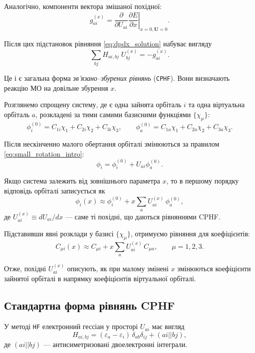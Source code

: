 \documentclass{PySCFBook}
\begin{document}
Аналогічно, компоненти вектора змішаної похідної:
\begin{equation}\label{eq:g_ai_def}
g_{ai}^{(x)}
=
\frac{\partial }{\partial U_{ai}}\left.\frac{\partial E}{\partial x}\right|_{x = 0, \mathbf U= 0}.
\end{equation}

Після цих підстановок рівняння \eqref{eq:dpdx_solution} набуває вигляду
\begin{equation}\label{eq:CPHF_matrix_general}
\sum_{b j} H_{ai,bj}\;U_{bj}^{(x)} = -g_{ai}^{(x)}.
\end{equation}

Це і є загальна форма \emph{зв'язано--збурених рівнянь} (\texttt{CPHF}).
Вони визначають реакцію МО на довільне збурення $x$.

\begin{commentbox}[Приклад]
Розглянемо спрощену систему, де є одна зайнята орбіталь $i$ та одна
віртуальна орбіталь $a$, розкладені за тими самими базисними функціями
$\{\chi_\mu\}$:
\[
\phi_i^{(0)} = C_{1i}\chi_1 + C_{2i}\chi_2 + C_{3i}\chi_3,\qquad
\phi_a^{(0)} = C_{1a}\chi_1 + C_{2a}\chi_2 + C_{3a}\chi_3.
\]

Після нескінченно малого обертання орбіталі змінюються за правилом
\eqref{eq:small_rotation_intro}:
\[
\phi_i = \phi_i^{(0)} + U_{ai}\phi_a^{(0)}.
\]

Якщо система залежить від зовнішнього параметра $x$, то в першому порядку відповідь орбіталі записується як
\[
\phi_i(x) \approx \phi_i^{(0)} + x\sum_a U_{ai}^{(x)}\,\phi_a^{(0)},
\]
де $U_{ai}^{(x)}\equiv dU_{ai}/dx$ — саме ті похідні, що даються рівняннями CPHF.

Підставивши явні розклади у базисі $\{\chi_\mu\}$, отримуємо рівняння для коефіцієнтів:
\[
C_{\mu i}(x) \approx C_{\mu i} + x\sum_a U_{ai}^{(x)}\,C_{\mu a},
\qquad \mu=1,2,3.
\]

Отже, похідні $U_{ai}^{(x)}$ описують, як при малому змінені $x$ змінюються
коефіцієнти зайнятої орбіталі в напрямку коефіцієнтів віртуальної орбіталі.
\end{commentbox}



\subsection{Стандартна форма рівнянь CPHF}

У методі \texttt{HF} електронний гессіан у просторі $U_{ai}$ має вигляд
\begin{equation}\label{eq:H_standard}
H_{ai,bj}
=
(\varepsilon_a - \varepsilon_i)\,\delta_{ab}\delta_{ij}
+ (ai||bj),
\end{equation}
де $(ai||bj)$ --- антисиметризовані двоелектронні інтеграли.
\end{document}
